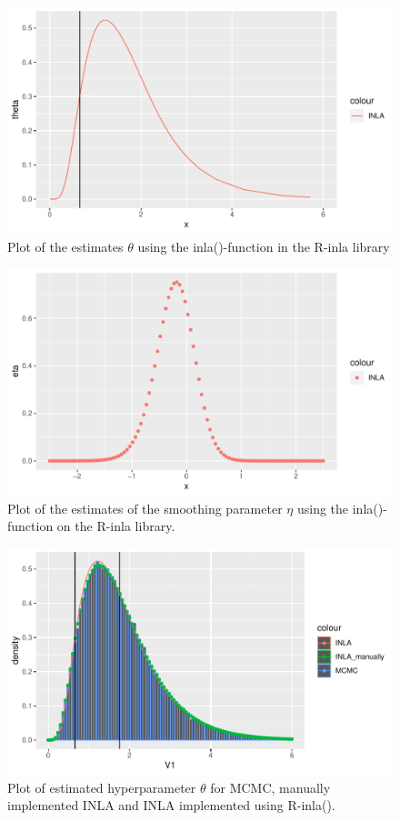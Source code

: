 \begin{figure}[h]
    \centering
    \includegraphics{Images/R_inla_theta.pdf}
    \caption{Plot of the estimates $\theta$ using the inla()-function in the R-inla library}
    \label{fig:r_inla_theta}
\end{figure}

\begin{figure}[h]
    \centering
    \includegraphics{Images/R_inla_eta.pdf}
    \caption{Plot of the estimates of the smoothing parameter $\eta$ using the inla()-function on the R-inla library.}
    \label{fig:r_inla_eta}
\end{figure}

\begin{figure}[h]
    \centering
    \includegraphics{Images/theta_comparison.pdf}
    \caption{Plot of estimated hyperparameter $\theta$ for MCMC, manually implemented INLA and INLA implemented using R-inla().}
    \label{fig:theta_comparison}
\end{figure}


